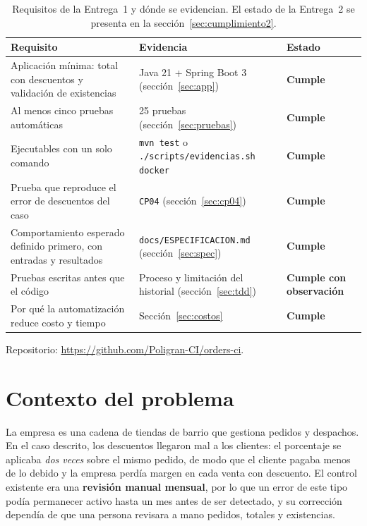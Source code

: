 \documentclass[11pt,a4paper]{article}
\newcommand{\ok}{\textcolor{ok}{\textbf{Cumple}}}
\newcommand{\parcial}{\textcolor{warn}{\textbf{Cumple con observación}}}
\newcommand{\repositorio}{\url{https://github.com/Poligran-CI/orders-ci}}
\begin{document}
\begin{table}[H]
\centering
\begin{tabularx}{\textwidth}{@{}L L l@{}}
\toprule
\textbf{Requisito} & \textbf{Evidencia} & \textbf{Estado}\\
\midrule
Aplicación mínima: total con descuentos y validación de existencias &
Java 21 + Spring Boot 3 (sección~\ref{sec:app}) & \ok\\
Al menos cinco pruebas automáticas & 25 pruebas (sección~\ref{sec:pruebas}) & \ok\\
Ejecutables con un solo comando & \texttt{mvn test} o \texttt{./scripts/evidencias.sh docker} & \ok\\
Prueba que reproduce el error de descuentos del caso &
\texttt{CP04} (sección~\ref{sec:cp04}) & \ok\\
Comportamiento esperado definido primero, con entradas y resultados &
\texttt{docs/ESPECIFICACION.md} (sección~\ref{sec:spec}) & \ok\\
Pruebas escritas antes que el código & Proceso y limitación del historial (sección~\ref{sec:tdd}) & \parcial\\
Por qué la automatización reduce costo y tiempo & Sección~\ref{sec:costos} & \ok\\
\bottomrule
\end{tabularx}
\caption{Requisitos de la Entrega~1 y dónde se evidencian. El estado de la Entrega~2 se presenta en
la sección~\ref{sec:cumplimiento2}.}
\label{tab:resumen1}
\end{table}

Repositorio: \repositorio.

\section{Contexto del problema}
\label{sec:contexto}

La empresa es una cadena de tiendas de barrio que gestiona pedidos y despachos. En el caso descrito,
los descuentos llegaron mal a los clientes: el porcentaje se aplicaba \emph{dos veces} sobre el mismo
pedido, de modo que el cliente pagaba menos de lo debido y la empresa perdía margen en cada venta con
descuento. El control existente era una \textbf{revisión manual mensual}, por lo que un error de este
tipo podía permanecer activo hasta un mes antes de ser detectado, y su corrección dependía de que una
persona revisara a mano pedidos, totales y existencias.
\end{document}
